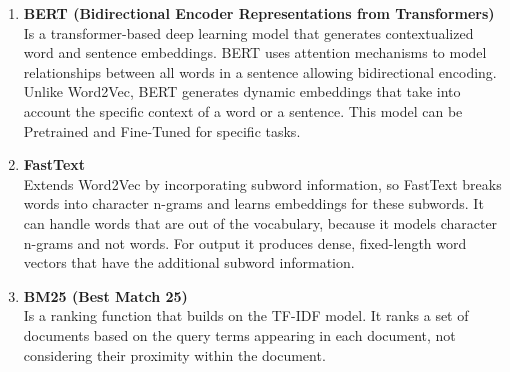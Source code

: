 \documentclass[\myFontSize,oneside,english,hidelinks,a4paper]{article}
\begin{document}
\begin{enumerate}
\item \textbf{BERT (Bidirectional Encoder Representations from Transformers)}\\
Is a transformer-based deep learning model that generates contextualized word and sentence embeddings. BERT uses attention mechanisms to model relationships between all words in a sentence allowing bidirectional encoding. Unlike Word2Vec, BERT generates dynamic embeddings that take into account the specific context of a word or a sentence. This model can be Pretrained and Fine-Tuned for specific tasks.

\item \textbf{FastText}\\
Extends Word2Vec by incorporating subword information, so FastText breaks words into character n-grams and learns embeddings for these subwords. It can handle words that are out of the vocabulary, because it models character n-grams and not words. For output it produces dense, fixed-length word vectors that have the additional subword information.

\item \textbf{BM25 (Best Match 25)}\\
Is a ranking function that builds on the TF-IDF model. It ranks a set of documents based on the query terms appearing in each document, not considering their proximity within the document.
\end{enumerate}
%
%
%
%
%
\end{document}
